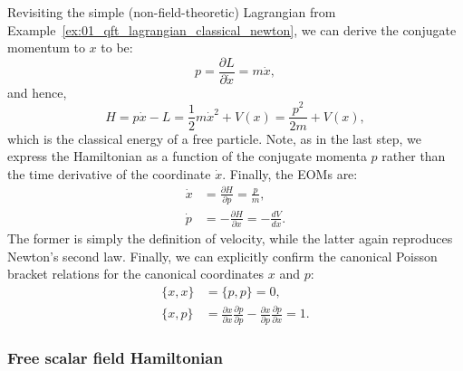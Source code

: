 \begin{example}
\label{ex:01_qft_hamiltonian}
Revisiting the simple (non-field-theoretic) Lagrangian from Example~\ref{ex:01_qft_lagrangian_classical_newton}, we can derive the conjugate momentum to $x$ to be:
\begin{equation}
	\label{eq:01_qft_hamiltonian_example_momenta}
	p = \frac{\partial L}{\partial\dot x} = m\dot x,
\end{equation}
and hence,
\begin{equation}
	\label{eq:01_qft_hamiltonian_example}
	H = p\dot x - L = \frac{1}{2}m\dot x^2 + V(x) = \frac{p^2}{2m} + V(x),
\end{equation}
which is the classical energy of a free particle.
Note, as in the last step, we express the Hamiltonian as a function of the conjugate momenta $p$ rather than the time derivative of the coordinate $\dot x$.
Finally, the EOMs are:
\begin{equation}
	\label{eq:01_qft_hamiltonian_example_eoms}
	\begin{split}
		\dot x &= \frac{\partial H}{\partial p} = \frac{p}{m}, \\
		\dot p &= -\frac{\partial H}{\partial x} = -\frac{dV}{dx}.
	\end{split}
\end{equation}
The former is simply the definition of velocity, while the latter again reproduces Newton's second law.
Finally, we can explicitly confirm the canonical Poisson bracket relations for the canonical coordinates $x$ and $p$:
\begin{equation}
	\label{eq:01_qft_hamiltonian_example_poisson}
	\begin{split}
		\{x, x\} &= \{p, p\} = 0, \\
		\{x, p\} &= \frac{\partial x}{\partial x}\frac{\partial p}{\partial p} - \frac{\partial x}{\partial p}\frac{\partial p}{\partial x} = 1.
	\end{split}
\end{equation}
\end{example}

\subsubsection{Free scalar field Hamiltonian}

